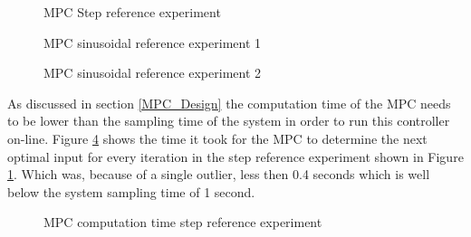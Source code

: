 \begin{figure}[ht]
    \centering
    
    \caption{MPC Step reference experiment}
    \label{fig:MPCstep}
\end{figure}


\begin{figure}[ht]
    \centering
    
    \caption{MPC sinusoidal reference experiment 1}
    \label{fig:MPCper1}
\end{figure}

\begin{figure}[ht]
    \centering
    
    \caption{MPC sinusoidal reference experiment 2}
    \label{fig:MPCper2}
\end{figure}

As discussed in section \ref{MPC_Design} the computation time of the MPC needs to be lower than the sampling time of the system in order to run this controller on-line. Figure \ref{fig:MPCcompTime} shows the time it took for the MPC to determine the next optimal input for every iteration in the step reference experiment shown in Figure \ref{fig:MPCstep}. Which was, because of a single outlier, less then 0.4 seconds which is well below the system sampling time of 1 second. 
\begin{figure}[h]
    \centering
    
    \caption{MPC computation time step reference experiment}
    \label{fig:MPCcompTime}
\end{figure}

